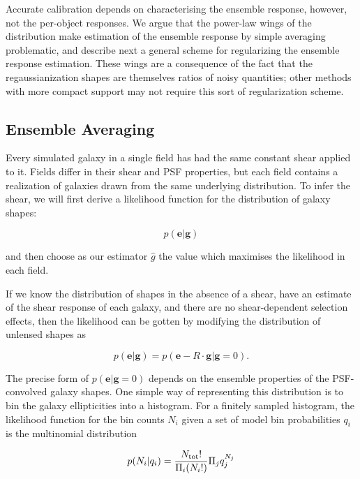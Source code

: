 \documentclass[iop]{emulateapj}
\begin{document}
Accurate calibration depends on characterising the ensemble response,
however, not the per-object responses. We argue that the power-law
wings of the distribution make estimation of the ensemble response by
simple averaging problematic, and describe next a general scheme for
regularizing the ensemble response estimation. These wings are
a consequence of the fact that the regaussianization shapes are
themselves ratios of noisy quantities; other methods with more compact
support may not require this sort of regularization scheme.

\subsection{Ensemble Averaging}
\label{sec:ensembleAvg}
Every simulated galaxy in a single field has had the same constant
shear applied to it. Fields differ in their shear and PSF properties,
but each field contains a realization of galaxies drawn from the same
underlying distribution. To infer the shear, we will first derive a
likelihood function for the distribution of galaxy shapes:

\begin{equation}
p(\mathbf{e}|\mathbf{g})
\end{equation}

and then choose as our estimator $\hat{g}$ the value which
maximises the likelihood in each field.

If we know the distribution of shapes in the absence of a shear, have
an estimate of the shear response of each galaxy, and there are no
shear-dependent selection effects, then the likelihood can be gotten
by modifying the distribution of unlensed shapes as

\begin{equation}
p(\mathbf{e}|\mathbf{g}) = p(\mathbf{e}-R\cdot\mathbf{g} | \mathbf{g}=0).
\end{equation}


The precise form of $p(\mathbf{e}|\mathbf{g}=0)$ depends on the ensemble properties
of the PSF-convolved galaxy shapes. One simple way of representing this
distribution is to bin the galaxy ellipticities into a histogram. For
a finitely sampled histogram, the likelihood function for the bin
counts $N_i$ given a set of model bin probabilities $q_i$ is the
multinomial distribution

\begin{equation}
p( N_i | q_i) = \frac{N_{\rm tot} !}{\Pi_i (N_i!)}\Pi_j q^{N_j}_j
\end{equation}
\end{document}
